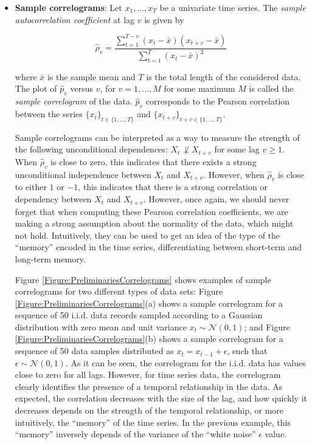 \begin{itemize}
\item \textbf{Sample correlograms}: Let ${x_1,...,x_T}$ be a univariate time series. The \emph{sample autocorrelation coefficient} at lag $v$ is given by 

$$ \hat{\rho}_v =\frac{\sum_{t=1}^{T-v} (x_t-\bar{x})(x_{t+v}-\bar{x})}{\sum_{t=1}^{T} (x_t-\bar{x})^2}$$ 

\noindent where $\bar{x}$ is the sample mean and $T$ is the total length of the considered data. The plot of $\hat{p}_v$ versus $v$, for $v=1,\ldots, M$ for some maximum $M$ is called the \emph{sample correlogram} of the data. $\hat{p}_v$ corresponds to the Pearson correlation between the series $\{x_t\}_{t\in\{1,...,T\}}$ and $\{x_{t+v}\}_{t+v\in\{1,...,T\}}$.

Sample correlograms can be interpreted as a way to measure the strength of the following unconditional dependences: $X_t  \not\perp X_{t+v}$ for some lag $v \geq 1$.  When $\hat{\rho}_v$ is close to zero, this indicates that there exists a strong unconditional independence between $X_t$ and $X_{t+v}$. However, when $\hat{\rho}_v$ is close to either $1$ or $-1$, this indicates that there is a strong correlation or dependency between $X_t$ and $X_{t+v}$. However, once again, we should never forget that when computing these Pearson correlation coefficients, we are making a strong assumption about the normality of the data, which might not hold. Intuitively, they can be used to get an idea of the type of the ``memory'' encoded in the time series, differentiating between short-term and long-term memory. 

Figure \ref{Figure:PreliminariesCorrelograms} shows examples of sample correlograms for two different types of data sets: Figure \ref{Figure:PreliminariesCorrelograms}(a) shows a sample correlogram for a sequence of 50 i.i.d. data records sampled according to a Gaussian distribution with zero mean and unit variance $x_t\sim {\mathcal N}(0,1)$; and Figure \ref{Figure:PreliminariesCorrelograms}(b) shows a sample correlogram for a sequence of 50 data samples distributed as $x_t=x_{t-1} + \epsilon$, such that $\epsilon\sim {\mathcal N}(0,1)$. As it can be seen, the correlogram for the i.i.d. data has values close to zero for all lags. However, for time series data, the correlogram clearly identifies the presence of a temporal relationship in the data. As expected, the correlation decreases with the size of the lag, and how quickly it decreases depends on the strength of the temporal relationship, or more intuitively, the ``memory'' of the time series. In the previous example, this ``memory'' inversely depends of the variance of the ``white noise'' $\epsilon$ value.


\end{itemize}
